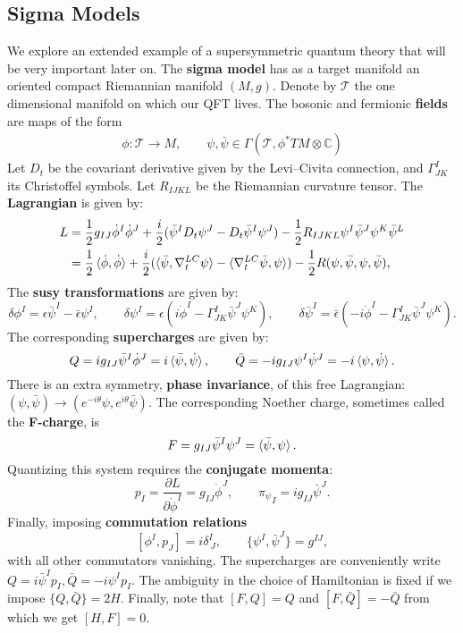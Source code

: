 \documentclass{report}
\theoremstyle{plain}
\theoremstyle{definition}
\theoremstyle{remark}
\newcommand{\di}{\partial}
\newcommand{\bC}{\mathbb{C}}
\newcommand{\mc}{\mathcal}
\newcommand{\sg}{\sigma}
\newcommand{\ten}{\otimes}
\newcommand{\FR}[2]{\frac{#1}{#2}}
\begin{document}
\subsection{Sigma Models}
We explore an extended example of a supersymmetric quantum theory that
will be very important later on. The {\bf sigma model} has as a target
manifold an oriented compact Riemannian manifold $(M, g)$. Denote by
$\mc T$ the one dimensional manifold on which our QFT lives. The
bosonic and fermionic {\bf fields} are maps of the form
\begin{align}
    \phi \colon \mc T\to M,\qquad \psi,\bar\psi\in\Gamma(\mc T,\phi^*TM\ten\bC)
    \label{sigmamodelvariables}
\end{align}
Let $D_t$ be the covariant derivative given by the Levi--Civita
connection, and $\Gamma^I_{JK}$ its Christoffel symbols. Let
$R_{IJKL}$ be the Riemannian curvature tensor. The {\bf Lagrangian} is
given by:
\begin{align} \label{sigmaModelRiemLag}
\begin{split}
    L &= \FR{1}{2}g_{IJ}\dot\phi^I\dot\phi^J + \FR{i}{2}(\bar\psi^I
    D_t\psi^J-D_t\bar\psi^I\psi^J) - \FR{1}{2} R_{IJKL}\psi^I\bar\psi^J
    \psi^K\bar\psi^L\\
    &=\FR{1}{2}\braket{\dot\phi,\dot\phi} +
    \FR{i}{2}(\braket{\bar\psi,\nabla^{LC}_t\psi}
    -\braket{\nabla^{LC}_t\bar\psi,\psi})
    -\FR{1}{2}R(\psi,\bar\psi,\psi,\bar\psi),
\end{split}
\end{align}
The {\bf susy transformations} are given by:
\[ \delta\phi^I = \epsilon\bar\psi^I-\bar\epsilon\psi^I,\qquad
\delta\psi^I = \epsilon(i\dot\phi^I-\Gamma^I_{JK}\bar\psi^J\psi^K),\qquad
\delta\bar\psi^I =\bar\epsilon(-i\dot\phi^I-\Gamma^I_{JK}\bar\psi^J\psi^K).
\]
The corresponding {\bf supercharges} are given by:
\[ Q = ig_{IJ}\bar\psi^I\dot\phi^J = i\braket{\bar\psi,\dot\psi},\qquad
\bar Q=-ig_{IJ}\psi^I\dot\psi^J=-i\braket{\psi,\dot\psi}.\] There is
an extra symmetry, {\bf phase invariance}, of this free Lagrangian:
$(\psi,\bar\psi) \to (e^{-i\theta}\psi,e^{i\theta}\bar\psi)$. The
corresponding Noether charge, sometimes called the {\bf F-charge}, is
\[ F = g_{IJ}\bar\psi^I\psi^J = \braket{\bar\psi,\psi}.\]
Quantizing this system requires the {\bf conjugate momenta}:
\[p_I = \FR{\di L}{\di\dot\phi^I}=g_{IJ}\dot\phi^J,\qquad {\pi_\psi}_I = ig_{IJ}\bar\psi^J.\]
Finally, imposing {\bf commutation relations}
\[ [\phi^I,p_J] = i\delta^I_{\ J},\qquad \{\psi^I,\bar\psi^J\} = g^{IJ},\]
with all other commutators vanishing. The supercharges are conveniently
write $Q=i\bar\psi^Ip_I, \bar Q = -i\psi^Ip_I$. The ambiguity in the
choice of Hamiltonian is fixed if we impose $\{Q,\bar Q\}=2H$.
Finally, note that $[F,Q]=Q$ and $[F,\bar Q]=-\bar Q$ from which we get
$[H,F]=0$.
\end{document}

